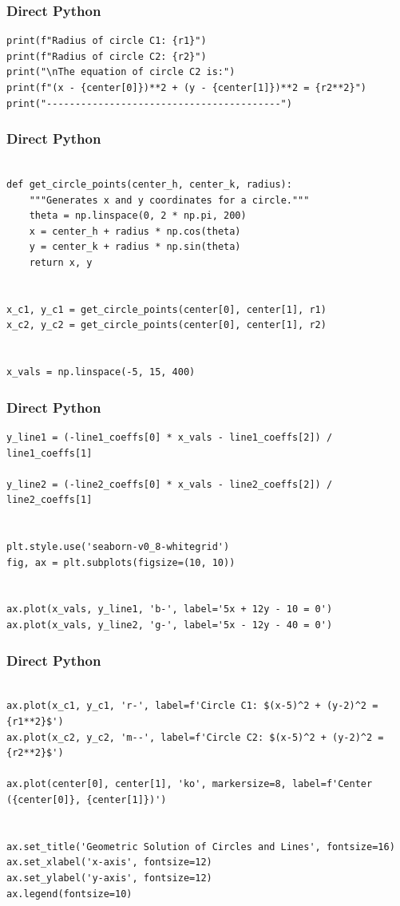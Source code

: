 \documentclass{beamer}
\begin{document}
\begin{frame}[fragile]
\frametitle{Direct Python}
\begin{lstlisting}
print(f"Radius of circle C1: {r1}")
print(f"Radius of circle C2: {r2}")
print("\nThe equation of circle C2 is:")
print(f"(x - {center[0]})**2 + (y - {center[1]})**2 = {r2**2}")
print("-----------------------------------------")

\end{lstlisting}
\end{frame}
\begin{frame}[fragile]
\frametitle{Direct Python}
\begin{lstlisting}

def get_circle_points(center_h, center_k, radius):
    """Generates x and y coordinates for a circle."""
    theta = np.linspace(0, 2 * np.pi, 200)
    x = center_h + radius * np.cos(theta)
    y = center_k + radius * np.sin(theta)
    return x, y


x_c1, y_c1 = get_circle_points(center[0], center[1], r1)
x_c2, y_c2 = get_circle_points(center[0], center[1], r2)


x_vals = np.linspace(-5, 15, 400)

\end{lstlisting}
\end{frame}
\begin{frame}[fragile]
\frametitle{Direct Python}
\begin{lstlisting}
y_line1 = (-line1_coeffs[0] * x_vals - line1_coeffs[2]) / line1_coeffs[1]

y_line2 = (-line2_coeffs[0] * x_vals - line2_coeffs[2]) / line2_coeffs[1]


plt.style.use('seaborn-v0_8-whitegrid')
fig, ax = plt.subplots(figsize=(10, 10))


ax.plot(x_vals, y_line1, 'b-', label='5x + 12y - 10 = 0')
ax.plot(x_vals, y_line2, 'g-', label='5x - 12y - 40 = 0')
\end{lstlisting}
\end{frame}
\begin{frame}[fragile]
\frametitle{Direct Python}
\begin{lstlisting}

ax.plot(x_c1, y_c1, 'r-', label=f'Circle C1: $(x-5)^2 + (y-2)^2 = {r1**2}$')
ax.plot(x_c2, y_c2, 'm--', label=f'Circle C2: $(x-5)^2 + (y-2)^2 = {r2**2}$')

ax.plot(center[0], center[1], 'ko', markersize=8, label=f'Center ({center[0]}, {center[1]})')


ax.set_title('Geometric Solution of Circles and Lines', fontsize=16)
ax.set_xlabel('x-axis', fontsize=12)
ax.set_ylabel('y-axis', fontsize=12)
ax.legend(fontsize=10)
\end{lstlisting}
\end{frame}
\end{document}
